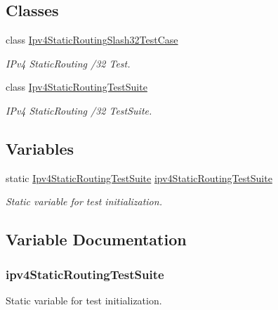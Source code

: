 \subsection*{Classes}
\begin{DoxyCompactItemize}
\item 
class \hyperlink{classIpv4StaticRoutingSlash32TestCase}{Ipv4\+Static\+Routing\+Slash32\+Test\+Case}
\begin{DoxyCompactList}\small\item\em I\+Pv4 Static\+Routing /32 Test. \end{DoxyCompactList}\item 
class \hyperlink{classIpv4StaticRoutingTestSuite}{Ipv4\+Static\+Routing\+Test\+Suite}
\begin{DoxyCompactList}\small\item\em I\+Pv4 Static\+Routing /32 Test\+Suite. \end{DoxyCompactList}\end{DoxyCompactItemize}
\subsection*{Variables}
\begin{DoxyCompactItemize}
\item 
static \hyperlink{classIpv4StaticRoutingTestSuite}{Ipv4\+Static\+Routing\+Test\+Suite} \hyperlink{ipv4-static-routing-test-suite_8cc_abf2e06acc0578cabb619fb0ab1660ca8}{ipv4\+Static\+Routing\+Test\+Suite}
\begin{DoxyCompactList}\small\item\em Static variable for test initialization. \end{DoxyCompactList}\end{DoxyCompactItemize}


\subsection{Variable Documentation}
\subsubsection[{\texorpdfstring{ipv4\+Static\+Routing\+Test\+Suite}{ipv4StaticRoutingTestSuite}}]{ ipv4\+Static\+Routing\+Test\+Suite\hspace{0.3cm}{\ttfamily [static]}}\hypertarget{ipv4-static-routing-test-suite_8cc_abf2e06acc0578cabb619fb0ab1660ca8}{}\label{ipv4-static-routing-test-suite_8cc_abf2e06acc0578cabb619fb0ab1660ca8}


Static variable for test initialization. 


